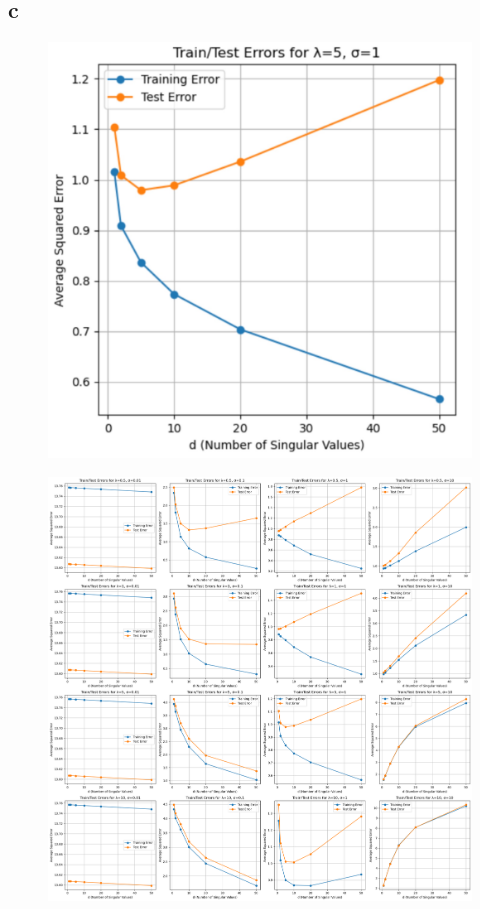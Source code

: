 \subsection{c}
\begin{figure}[!ht]
    \centering\includegraphics[width=0.6\linewidth]{mseUVbest.jpg}
\end{figure}
\begin{figure}[!ht]
    \centering\includegraphics[width=1\linewidth]{UVErrors.png}
\end{figure}

\inputminted{python}{../hw4-A/homeworks/matrix_completion_and_recommendation_systems_started_code.py}